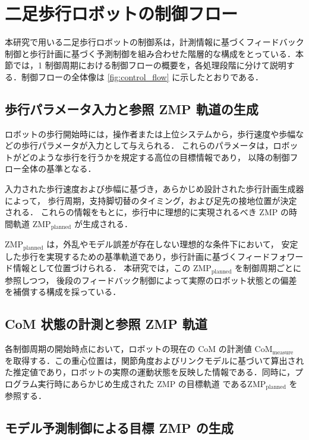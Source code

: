 \section{二足歩行ロボットの制御フロー}
\label{sec:control_flow}

本研究で用いる二足歩行ロボットの制御系は，計測情報に基づくフィードバック制御と歩行計画に基づく予測制御を組み合わせた階層的な構成をとっている．本節では，1 制御周期における制御フローの概要を，各処理段階に分けて説明する．制御フローの全体像は \cref{fig:control_flow} に示したとおりである．

\subsection{歩行パラメータ入力と参照 ZMP 軌道の生成}
\label{subsec:zmp_planned_generation}

ロボットの歩行開始時には，操作者または上位システムから，歩行速度や歩幅などの歩行パラメータが入力として与えられる．
これらのパラメータは，ロボットがどのような歩行を行うかを規定する高位の目標情報であり，
以降の制御フロー全体の基準となる．

入力された歩行速度および歩幅に基づき，あらかじめ設計された歩行計画生成器によって，
歩行周期，支持脚切替のタイミング，および足先の接地位置が決定される．
これらの情報をもとに，歩行中に理想的に実現されるべき ZMP の時間軌道
$\mathrm{ZMP}_{\mathrm{planned}}$ が生成される．

$\mathrm{ZMP}_{\mathrm{planned}}$ は，外乱やモデル誤差が存在しない理想的な条件下において，
安定した歩行を実現するための基準軌道であり，歩行計画に基づくフィードフォワード情報として位置づけられる．
本研究では，この $\mathrm{ZMP}_{\mathrm{planned}}$ を制御周期ごとに参照しつつ，
後段のフィードバック制御によって実際のロボット状態との偏差を補償する構成を採っている．

\subsection{CoM 状態の計測と参照 ZMP 軌道}
\label{subsec:com_meas_zmp_planned}

各制御周期の開始時点において，ロボットの現在の CoM の計測値 $\mathrm{CoM}_{\mathrm{measure}}$ を取得する．この重心位置は，関節角度およびリンクモデルに基づいて算出された推定値であり，ロボットの実際の運動状態を反映した情報である．同時に，プログラム実行時にあらかじめ生成された ZMP の目標軌道 である$\mathrm{ZMP}_{\mathrm{planned}}$ を参照する．

\subsection{モデル予測制御による目標 ZMP の生成}
\label{subsec:zmp_ref_generation}

